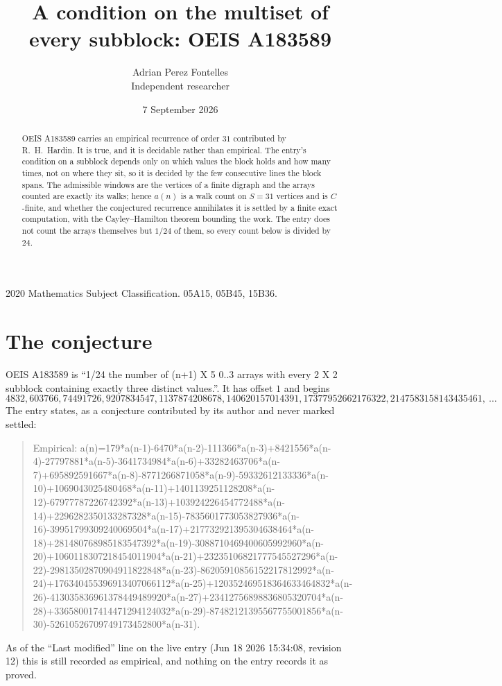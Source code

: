 \documentclass[11pt,a4paper]{article}
\title{A condition on the multiset of every subblock: OEIS A183589}
\author{Adrian Perez Fontelles\\ \small Independent researcher}
\date{7 September 2026}
\theoremstyle{plain}
\theoremstyle{definition}
\begin{document}
\maketitle

\begin{abstract}
OEIS A183589 carries an empirical recurrence of order $31$ contributed by R.~H.~Hardin. It is
true, and it is decidable rather than empirical. The entry's condition on a subblock depends
only on which values the block holds and how many times, not on where they sit, so it is
decided by the few consecutive lines the block spans. The admissible windows are the vertices
of a finite digraph and the arrays counted are exactly its walks; hence $a(n)$ is a walk count
on $S=31$ vertices and is $C$-finite, and whether the conjectured recurrence annihilates it
is settled by a finite exact computation, with the Cayley--Hamilton theorem bounding the
work. The entry does not count the arrays themselves but $1/24$ of them, so every count below is divided by $24$.
\end{abstract}

\noindent\small 2020 Mathematics Subject Classification. 05A15, 05B45, 15B36.\normalsize

\section{The conjecture}

OEIS A183589 is ``1/24 the number of (n+1) X 5 0..3 arrays with every 2 X 2 subblock containing exactly three distinct values.''. It has offset $1$ and begins
\[
4832, 603766, 74491726, 9207834547, 1137874208678, 140620157014391, 17377952662176322, 2147583158143435461,\ \dots
\]
The entry states, as a conjecture contributed by its author and never marked settled:
\begin{quote}
Empirical: a(n)=179*a(n-1)-6470*a(n-2)-111366*a(n-3)+8421556*a(n-4)-27797881*a(n-5)-3641734984*a(n-6)+33282463706*a(n-7)+695892591667*a(n-8)-8771266871058*a(n-9)-59332612133336*a(n-10)+1069043025480468*a(n-11)+1401139251128208*a(n-12)-67977787226742392*a(n-13)+103924226454772488*a(n-14)+2296282350133287328*a(n-15)-7835601773053827936*a(n-16)-39951799309240069504*a(n-17)+217732921395304638464*a(n-18)+281480768985183547392*a(n-19)-3088710469400605992960*a(n-20)+1060118307218454011904*a(n-21)+23235106821777545527296*a(n-22)-29813502870904911822848*a(n-23)-86205910856152217812992*a(n-24)+176340455396913407066112*a(n-25)+120352469518364633464832*a(n-26)-413035836961378449489920*a(n-27)+23412756898836805320704*a(n-28)+336580017414471294124032*a(n-29)-87482121395567755001856*a(n-30)-52610526709749173452800*a(n-31).
\end{quote}
As of the ``Last modified'' line on the live entry (Jun 18 2026 15:34:08, revision 12) this is still
recorded as empirical, and nothing on the entry records it as proved.
\end{document}
